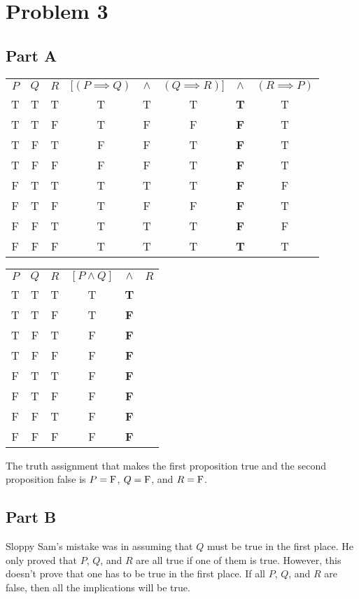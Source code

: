 \documentclass{article}
\begin{document}
\section*{Problem 3}

\subsection*{Part A}

\begin{center}
  \begin{tabular}{ c c c c c c c c }
    $P$ & $Q$ & $R$ & $[(P \implies Q)$ & $\land$ & $(Q \implies R)]$ & $\land$ &
    $(R \implies P)$ \\
    T & T & T & T & T & T & \textbf{T} & T \\
    T & T & F & T & F & F & \textbf{F} & T \\
    T & F & T & F & F & T & \textbf{F} & T \\
    T & F & F & F & F & T & \textbf{F} & T \\
    F & T & T & T & T & T & \textbf{F} & F \\
    F & T & F & T & F & F & \textbf{F} & T \\
    F & F & T & T & T & T & \textbf{F} & F \\
    F & F & F & T & T & T & \textbf{T} & T \\
  \end{tabular}
\end{center}

\begin{center}
  \begin{tabular}{ c c c c c c }
    $P$ & $Q$ & $R$ & $[P \land Q]$ & $\land$ & $R$ \\
    T & T & T & T & \textbf{T} &  \\
    T & T & F & T & \textbf{F} &  \\
    T & F & T & F & \textbf{F} &  \\
    T & F & F & F & \textbf{F} &  \\
    F & T & T & F & \textbf{F} &  \\
    F & T & F & F & \textbf{F} &  \\
    F & F & T & F & \textbf{F} &  \\
    F & F & F & F & \textbf{F} &  \\
  \end{tabular}
\end{center}

The truth assignment that makes the first proposition true and the second
proposition false is $P = \rm{F}$, $Q = \rm{F}$, and $R = \rm{F}$.

\subsection*{Part B}

Sloppy Sam's mistake was in assuming that $Q$ must be true in the first place.
He only proved that $P$, $Q$, and $R$ are all true if one of them is true.
However, this doesn't prove that one has to be true in the first place. If all
$P$, $Q$, and $R$ are false, then all the implications will be true.
\end{document}
